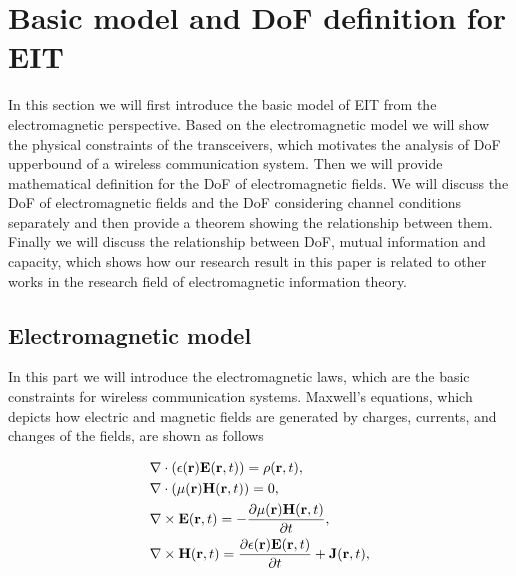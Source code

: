 \documentclass[12pt,draftclsnofoot,journal,onecolumn]{IEEEtran}
\begin{document}
{\color{red}\section{Basic model and DoF definition for EIT}

In this section we will first introduce the basic model of EIT from the electromagnetic perspective. Based on the electromagnetic model we will show the physical constraints of the transceivers, which motivates the analysis of DoF upperbound of a wireless communication system. Then we will provide mathematical definition for the DoF of electromagnetic fields. We will discuss the DoF of electromagnetic fields and the DoF considering channel conditions separately and then provide a theorem showing the relationship between them. Finally we will discuss the relationship between DoF, mutual information and capacity, which shows how our research result in this paper is related to other works in the research field of electromagnetic information theory.

\subsection{Electromagnetic model}

In this part we will introduce the electromagnetic laws, which are the basic constraints for wireless communication systems. Maxwell's equations, which depicts how electric and magnetic fields are generated by charges, currents, and changes of the fields, are shown as follows\cite{griffiths2005introduction}

\begin{subequations}
	\begin{align} 
		& \nabla \cdot  (\epsilon({\bf r}) {\bf E}({\bf r},t)) = \rho({\bf r},t), \label{eqn_1a}\\
		& \nabla \cdot (\mu({\bf r}) {\bf H}({\bf r},t)) = 0,\\
		&\nabla \times {\bf E}({\bf r},t) = -\frac{\partial \mu({\bf r}) {\bf H}({\bf r},t)}{\partial t}, \label{eqn_1c}\\
		& \nabla \times {\bf H}({\bf r},t) = \frac{ \partial \epsilon({\bf r}) {\bf E}({\bf r},t)}{\partial t}+{\bf J}({\bf r},t) \label{eqn_1d}, 
	\end{align}
\end{subequations}

}
\end{document}
